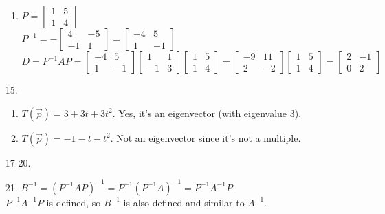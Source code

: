 \documentclass[leqno]{article}
\begin{document}
\begin{enumerate}
\begin{enumerate}
        \item
        $P = \begin{bmatrix}1 & 5 \\ 1 & 4\end{bmatrix}$\\
        $P^{-1} = -\begin{bmatrix}4 & -5 \\ -1 & 1\end{bmatrix} = \begin{bmatrix}-4 & 5 \\ 1 & -1\end{bmatrix}$\\
        $D = P^{-1}AP =
        \begin{bmatrix}-4 & 5 \\ 1 & -1\end{bmatrix}
        \begin{bmatrix}1 & 1 \\ -1 & 3\end{bmatrix}
        \begin{bmatrix}1 & 5 \\ 1 & 4\end{bmatrix} =
        \begin{bmatrix}-9 & 11 \\ 2 & -2\end{bmatrix}
        \begin{bmatrix}1 & 5 \\ 1 & 4\end{bmatrix} =
        \begin{bmatrix}2 & -1 \\ 0 & 2\end{bmatrix}$
    \end{enumerate}

    \item[15.]
    \begin{enumerate}
        \item $T(\Vec{p}) = 3 + 3t + 3t^2$. Yes, it's an eigenvector (with eigenvalue 3).
        \item $T(\Vec{p}) = -1 - t - t^2$. Not an eigenvector since it's not a multiple.
    \end{enumerate}

    \item[17-20.]
    \item[21.]
    $B^{-1} = (P^{-1}AP)^{-1} = P^{-1}(P^{-1}A)^{-1} = P^{-1}A^{-1}P$\\
    $P^{-1}A^{-1}P$ is defined, so $B^{-1}$ is also defined and similar to $A^{-1}$.
    

\end{enumerate}
\end{document}
